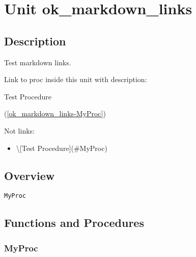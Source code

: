 \documentclass{report}
\newif\ifpdf
\begin{document}
\label{toc}\tableofcontents
\newpage
\newlength{\tmplength}
\chapter{Unit ok{\_}markdown{\_}links}
\label{ok_markdown_links}
\section{Description}
Test markdown links.\hfill\vspace*{1ex}



Link to proc inside this unit with description: \begin{ttfamily}Test Procedure\end{ttfamily}(\ref{ok_markdown_links-MyProc})

Not links:

\begin{itemize}
\item {\textbackslash}[Test Procedure]({\#}MyProc)
\end{itemize}
\section{Overview}
\begin{description}
\item[\texttt{MyProc}]
\end{description}
\section{Functions and Procedures}
\ifpdf
\subsection*{\large{\textbf{MyProc}}\normalsize\hspace{1ex}\hrulefill}
\else
\end{document}
